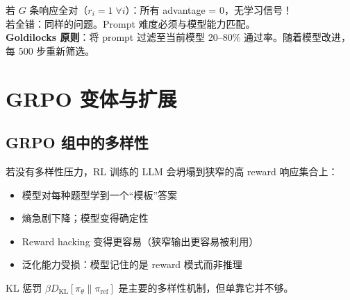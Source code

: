 \begin{keybox}[关键：组内必须同时包含成功与失败]
若 $G$ 条响应全对（$r_i = 1 \;\forall i$）：所有 advantage = 0，无学习信号！\\

若全错：同样的问题。Prompt 难度必须与模型能力匹配。\\

\textbf{Goldilocks 原则}：将 prompt 过滤至当前模型 20--80\% 通过率。随着模型改进，每 500 步重新筛选。
\end{keybox}

\section{GRPO 变体与扩展}
\label{grpo-variants-and-extensions}

\subsection{GRPO 组中的多样性}
\label{diversity-in-grpo-groups}

\begin{intuitionbox}[RL 训练中的模式坍塌]
若没有多样性压力，RL 训练的 LLM 会坍塌到狭窄的高 reward 响应集合上：

\begin{itemize}
  \item 模型对每种题型学到一个“模板”答案
  \item 熵急剧下降；模型变得确定性
  \item Reward hacking 变得更容易（狭窄输出更容易被利用）
  \item 泛化能力受损：模型记住的是 reward 模式而非推理
\end{itemize}

KL 惩罚 $\beta D_\text{KL}[\pi_\theta \| \pi_\text{ref}]$ 是主要的多样性机制，但单靠它并不够。
\end{intuitionbox}

